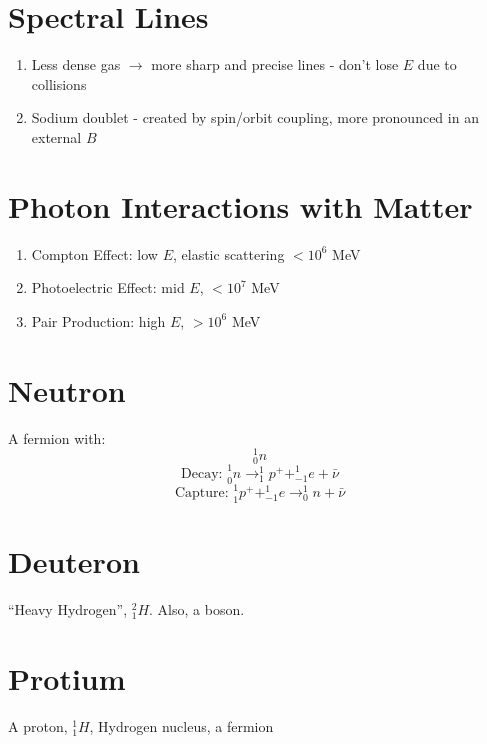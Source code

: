 \documentclass[10pt,letter]{article}
\begin{document}
\section{Spectral Lines} %
\label{sec:spectral_lines}
\begin{enumerate}
    \item Less dense gas $\rightarrow$ more sharp and precise lines - don't lose $E$ due to collisions
    \item Sodium doublet - created by spin/orbit coupling, more pronounced in an external $B$ 
\end{enumerate}

\section{Photon Interactions with Matter} %
\label{sec:photon_interactions_with_matter}
\begin{enumerate}
    \item Compton Effect: low $E$, elastic scattering $< 10^6$ MeV 
    \item Photoelectric Effect: mid $E$, $ < 10^7$ MeV
    \item Pair Production: high $E$, $ >10^6$ MeV
\end{enumerate}

\section{Neutron} %
\label{sec:neutron}
A fermion with:
\begin{equation}
    ^1_0n
\end{equation}
\begin{equation}
    \textrm{Decay: }^1_0n \rightarrow ^1_1p^+ + ^1_{-1}e + \bar{\nu}
\end{equation}
\begin{equation}
    \textrm{Capture: }^1_1p^+ + ^1_{-1}e \rightarrow ^1_0n + \bar{\nu}
\end{equation}

\section{Deuteron} %
\label{sec:deuteron}
``Heavy Hydrogen'', $^2_1H$. Also, a boson.

\section{Protium} %
\label{sec:protium}
A proton, $^1_1H$, Hydrogen nucleus, a fermion
\end{document}
